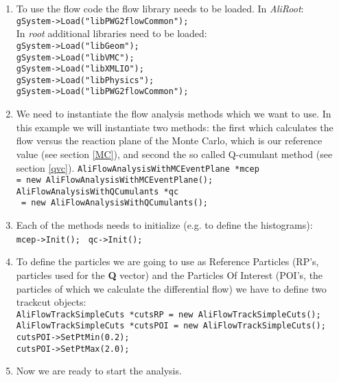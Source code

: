 \begin{enumerate}
\item
To use the flow code the flow library needs to be loaded. In  \textit{AliRoot}:\\
\texttt{gSystem->Load("libPWG2flowCommon");}\\
In  \textit{root} additional libraries need to be loaded: \\
\texttt{gSystem->Load("libGeom");}\\
\texttt{gSystem->Load("libVMC");}\\
\texttt{gSystem->Load("libXMLIO");}\\
\texttt{gSystem->Load("libPhysics");}\\
\texttt{gSystem->Load("libPWG2flowCommon");}\\
\item
We need to instantiate the flow analysis methods which we want to use. In this example we will
instantiate two methods: the first  which calculates the flow versus the reaction plane of the Monte Carlo, which is our reference value (see section \ref{MC}), 
and second the so called Q-cumulant method (see section \ref{qvc}).
\texttt{AliFlowAnalysisWithMCEventPlane *mcep} \\
\texttt{= new AliFlowAnalysisWithMCEventPlane();}\\
\texttt{AliFlowAnalysisWithQCumulants *qc}\\
 \texttt{ = new AliFlowAnalysisWithQCumulants();}\\
 \item
 Each of the methods needs to initialize (e.g. to define the histograms): \\
 \texttt{mcep->Init(); }
\texttt{qc->Init();}\\
\item
To define the particles we are going to use as Reference Particles (RP's, particles 
used for the {\bf Q} vector) and the Particles Of Interest (POI's, the particles of which 
we calculate the differential flow) we have to define two trackcut objects:\\
\texttt{AliFlowTrackSimpleCuts *cutsRP = new AliFlowTrackSimpleCuts();}\\
\texttt{AliFlowTrackSimpleCuts *cutsPOI = new AliFlowTrackSimpleCuts();}\\
\texttt{cutsPOI->SetPtMin(0.2);}\\
\texttt{cutsPOI->SetPtMax(2.0);}\\
\item
Now we are ready to start the analysis.  

\end{enumerate}
